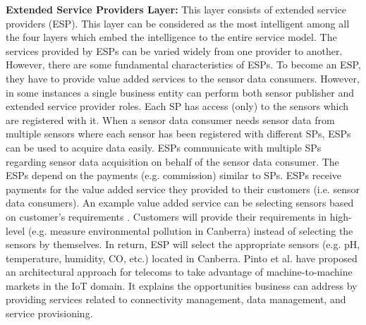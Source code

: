 \documentclass[conference]{IEEEtran}
\begin{document}
\textbf{Extended Service Providers Layer:} This layer consists of extended service providers (ESP). This layer can be considered as the most intelligent among all the four layers which embed the intelligence to the entire service model. The services provided by ESPs can be varied widely from one provider to another. However, there are some fundamental characteristics of ESPs. To become an ESP, they have to provide value added services to the sensor data consumers. However, in some instances a single business entity can perform both sensor publisher and extended service provider roles. Each SP has access (only) to the sensors which are registered with it. When a sensor data consumer needs sensor data from multiple sensors where each sensor has been registered with different SPs, ESPs can be used to acquire data easily. ESPs communicate with multiple SPs regarding sensor data acquisition on behalf of the sensor data consumer. The ESPs depend on the payments (e.g. commission) similar to SPs. ESPs receive payments for the value added service they provided to their customers (i.e. sensor data consumers). An example value added service can be selecting sensors based on customer's requirements \cite{ZMP004}. Customers will provide their requirements in high-level (e.g. measure environmental pollution in Canberra) instead of selecting the sensors by themselves. In return, ESP will select the appropriate sensors (e.g. pH, temperature, humidity, CO, etc.) located in Canberra. Pinto et al. \cite{P666} have proposed  an architectural approach for telecoms to take advantage of machine-to-machine markets in the IoT domain. It explains the opportunities  business can address by providing services related to connectivity management, data management, and service provisioning.
\end{document}
